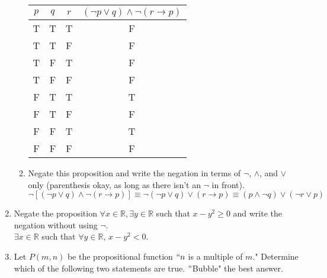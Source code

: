 \documentclass[12pt]{amsart}
\theoremstyle{definition}
\theoremstyle{remark}
\newcommand{\reals}{\mathbb R}
\begin{document}
\begin{enumerate}
\begin{enumerate}
\begin{table}[h]
\begin{center}
{\color{red}
\begin{tabular}{c|c|c|c}
  $p$ & $q$ & $r$ & $(\lnot p \vee q) \wedge \lnot(r\rightarrow p)$ \\
  \hline
  T  & T & T & F \\
  \hline
  T & T & F & F \\
  \hline
  T  & F & T & F  \\
  \hline
  T & F & F & F  \\
  \hline
  F & T & T & T  \\
  \hline
  F & T & F & F  \\
  \hline
  F & F & T & T  \\
  \hline
  F & F & F & F  \\

\end{tabular}}
\end{center}
\end{table}



\vspace{2cm}

\item Negate this proposition and write the negation in terms of $\lnot$, $\wedge$, and $\vee$ only (parenthesis okay, as long as there isn't an $\lnot$ in front).\\

{\color{red} $\lnot[(\lnot p \vee q) \wedge \lnot(r\rightarrow p)]\equiv \lnot(\lnot p \vee q) \vee (r\rightarrow p)\equiv (p\wedge \lnot q)\vee (\lnot r\vee p)$}


\vspace{2cm}


\end{enumerate}

\item  Negate the proposition $\forall x\in\reals, \exists y\in\reals$ such that $x-y^2\geq 0$ and write the negation without using $\lnot$.\\


{\color{red} $\exists x\in\reals$ such that $\forall y\in\reals$, $x-y^2<0$.}

\newpage

\item Let $P(m,n)$ be the propositional function $``n$ is a multiple of $m$."  Determine which of the following two statements are true.  $``$Bubble" the best answer.\\


\end{enumerate}
\end{document}
